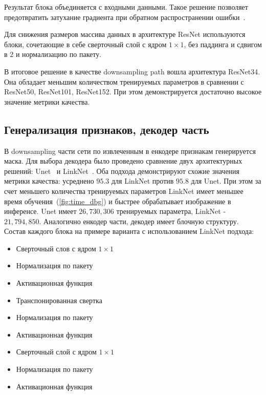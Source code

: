 Результат блока объединяется с входными данными.
Такое решение позволяет предотвратить затухание градиента при обратном распространении ошибки~\autocite{he2015deep}.

Для снижения размеров массива данных в архитектуре ResNet используются блоки, сочетающие в себе сверточный слой
с ядром $1 \times 1$, без паддинга и сдвигом в 2 и нормализацию по пакету.

В итоговое решение в качестве downsampling path вошла архитектура ResNet34.
Она обладает меньшим количеством тренируемых параметров в сравнении с ResNet50, ResNet101, ResNet152.
При этом демонстрируется достаточно высокое значение метрики качества.

\subsection{Генерализация признаков, декодер часть}

В downsampling части сети по извлеченным в енкодере признакам генерируется маска.
Для выбора декодера было проведено сравнение двух архитектурных решений: Unet~\autocite{ronneberger2015unet} и LinkNet~\autocite{chaurasia2017linknet}.
Оба подхода демонстрируют схожие значения метрики качества: усреднено $ 95.3 $ для LinkNet против $ 95.8 $ для Unet.
При этом за счет меньшего количества тренируемых параметров LinkNet имеет меньшее время обучения~(\ref{fig:time_dbg}) и быстрее обрабатывает изображение в инференсе.
Unet имеет $ 26,730,306 $ тренируемых параметра, LinkNet - $ 21,794,850 $.
Аналогично енкодер части, декодер имеет блочную структуру.
Состав каждого блока на примере варианта с использованием LinkNet подхода:

\begin{itemize}
    \item Сверточный слов с ядром $ 1 \times 1 $
    \item Нормализация по пакету
    \item Активационная функция
    \item Транспонированная свертка
    \item Нормализация по пакету
    \item Активационная функция
    \item Сверточный слой с ядром $ 1 \times 1 $
    \item Нормализация по пакету
    \item Активационная функция
\end{itemize}


